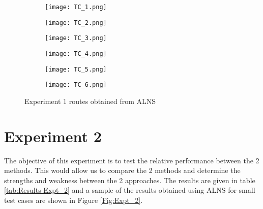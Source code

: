 \begin{figure} 
\begin{subfigure}{.5\textwidth}
	\texttt{[image: TC\_1.png]}
\end{subfigure}
\begin{subfigure}{.5\textwidth}
	\texttt{[image: TC\_2.png]}
\end{subfigure}

\begin{subfigure}{.5\textwidth}
	\texttt{[image: TC\_3.png]}
\end{subfigure}
\begin{subfigure}{.5\textwidth}
	\texttt{[image: TC\_4.png]}
\end{subfigure}

\begin{subfigure}{.5\textwidth}
	\texttt{[image: TC\_5.png]}
\end{subfigure}
\begin{subfigure}{.5\textwidth}
	\texttt{[image: TC\_6.png]}
\end{subfigure}
\caption{Experiment 1 routes obtained from ALNS} \label{Fig:Expt_1}
\end{figure} 

\section{Experiment 2}
The objective of this experiment is to test the relative performance between the 2 methods. This would allow us to compare the 2 methods and determine the strengths and weakness between the 2 approaches. The results are given in table \ref{tab:Results Expt_2} and a sample of the results obtained using ALNS for small test cases are shown in Figure \ref{Fig:Expt_2}.

